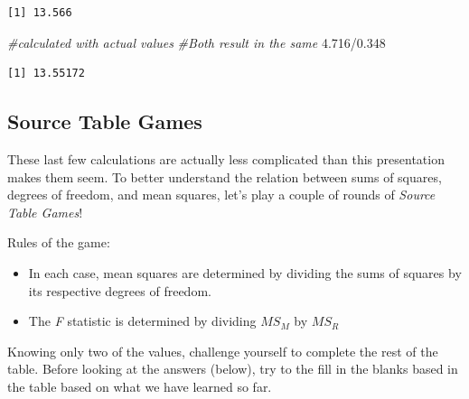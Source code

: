 \documentclass[
  11pt,
]{book}
\newenvironment{Shaded}{\begin{snugshade}}{\end{snugshade}}
\newcommand{\CommentTok}[1]{\textcolor[rgb]{0.56,0.35,0.01}{\textit{#1}}}
\newcommand{\FloatTok}[1]{\textcolor[rgb]{0.00,0.00,0.81}{#1}}
\newcommand{\SpecialCharTok}[1]{\textcolor[rgb]{0.00,0.00,0.00}{#1}}
\providecommand{\tightlist}{%
  \setlength{\itemsep}{0pt}\setlength{\parskip}{0pt}}
\begin{document}
\begin{verbatim}
[1] 13.566
\end{verbatim}

\begin{Shaded}
\begin{Highlighting}[]
\CommentTok{\#calculated with actual values}
\CommentTok{\#Both result in the same}
\FloatTok{4.716}\SpecialCharTok{/}\FloatTok{0.348}
\end{Highlighting}
\end{Shaded}

\begin{verbatim}
[1] 13.55172
\end{verbatim}

\hypertarget{source-table-games}{%
\subsection{Source Table Games}\label{source-table-games}}

These last few calculations are actually less complicated than this presentation makes them seem. To better understand the relation between sums of squares, degrees of freedom, and mean squares, let's play a couple of rounds of \emph{Source Table Games}!

Rules of the game:

\begin{itemize}
\tightlist
\item
  In each case, mean squares are determined by dividing the sums of squares by its respective degrees of freedom.
\item
  The \emph{F} statistic is determined by dividing \(MS_M\) by \(MS_R\)
\end{itemize}

Knowing only two of the values, challenge yourself to complete the rest of the table. Before looking at the answers (below), try to the fill in the blanks based in the table based on what we have learned so far.
\end{document}
